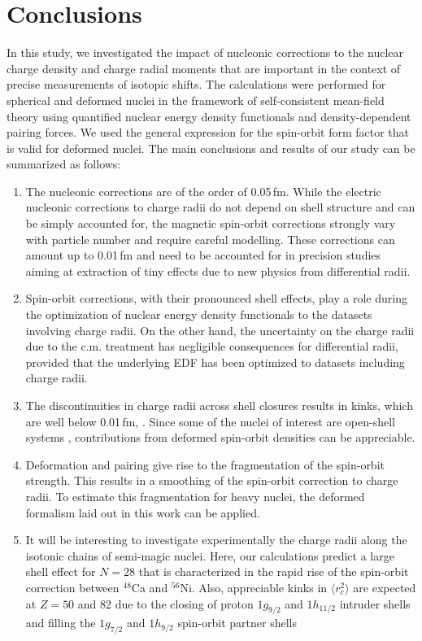 \documentclass[aps,prc,twocolumn,floatfix,nofootinbib,preprintnumbers,superscriptaddress,longbibliography]{revtex4-1}
\begin{document}
\section{Conclusions}\label{sec:Conclusions}
In this study, we investigated the impact of nucleonic corrections to the nuclear charge density and charge radial moments that are important in the context of precise  measurements  of  isotopic shifts.  The calculations were performed for spherical and deformed nuclei in the framework of self-consistent mean-field theory  using  quantified  nuclear energy density functionals and density-dependent pairing forces. We used the general expression
for the spin-orbit form factor that is valid for deformed nuclei.
The main conclusions and results of our study can be summarized
as follows:
\begin{enumerate}[label=(\roman*)]
\item
The nucleonic corrections are of the order of 0.05\,fm.  While the electric  nucleonic corrections to charge radii  do not depend on shell structure  and can be simply accounted for, the magnetic spin-orbit corrections strongly vary with particle number and require careful modelling. These  corrections can amount up to 0.01\,fm and need to be accounted for in precision studies  aiming at  extraction of tiny effects due to new physics from differential radii.

\item
Spin-orbit  corrections, with their pronounced shell effects, play a role  during the optimization of nuclear energy density functionals to the datasets involving charge radii.  On the other hand,
the uncertainty on
the charge radii due to the c.m. treatment has  negligible consequences for differential
radii, provided that the underlying EDF has been optimized to datasets including charge radii.



 \item 
 The discontinuities in charge radii across  shell closures
 results in kinks, which are  
 well below 0.01\,fm,  \cite{Gor19}. Since some of the nuclei of interest  are open-shell  systems \cite{Goodacre2020}, contributions from deformed spin-orbit densities can be appreciable.
 

\item
Deformation and pairing give rise to the fragmentation of the spin-orbit strength. This results in a smoothing of the spin-orbit correction to charge radii. To estimate this fragmentation for heavy nuclei, the deformed formalism laid out  in this work can be applied.

\item
It will be interesting to investigate experimentally the charge radii along the isotonic chains of semi-magic nuclei. Here, our calculations predict
a large shell effect  for $N=28$ that is characterized in the rapid rise of the spin-orbit correction between $^{48}$Ca and 
$^{56}$Ni. Also,
appreciable kinks in $\langle r^2_c\rangle$ are expected at $Z=50$ and 82 due to the closing of
proton $1g_{9/2}$ and  $1h_{11/2}$ intruder shells and filling the $1g_{7/2}$ and  $1h_{9/2}$ spin-orbit partner shells
\end{enumerate}
\end{document}

